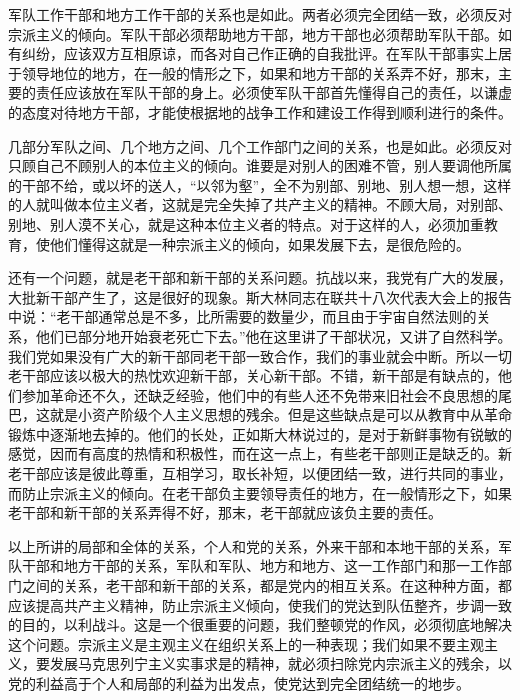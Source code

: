 军队工作干部和地方工作干部的关系也是如此。两者必须完全团结一致，必须反对宗派主义的倾向。军队干部必须帮助地方干部，地方干部也必须帮助军队干部。如有纠纷，应该双方互相原谅，而各对自己作正确的自我批评。在军队干部事实上居于领导地位的地方，在一般的情形之下，如果和地方干部的关系弄不好，那末，主要的责任应该放在军队干部的身上。必须使军队干部首先懂得自己的责任，以谦虚的态度对待地方干部，才能使根据地的战争工作和建设工作得到顺利进行的条件。

几部分军队之间、几个地方之间、几个工作部门之间的关系，也是如此。必须反对只顾自己不顾别人的本位主义的倾向。谁要是对别人的困难不管，别人要调他所属的干部不给，或以坏的送人，“以邻为壑”，全不为别部、别地、别人想一想，这样的人就叫做本位主义者，这就是完全失掉了共产主义的精神。不顾大局，对别部、别地、别人漠不关心，就是这种本位主义者的特点。对于这样的人，必须加重教育，使他们懂得这就是一种宗派主义的倾向，如果发展下去，是很危险的。

还有一个问题，就是老干部和新干部的关系问题。抗战以来，我党有广大的发展，大批新干部产生了，这是很好的现象。斯大林同志在联共十八次代表大会上的报告中说：“老干部通常总是不多，比所需要的数量少，而且由于宇宙自然法则的关系，他们已部分地开始衰老死亡下去。”他在这里讲了干部状况，又讲了自然科学。我们党如果没有广大的新干部同老干部一致合作，我们的事业就会中断。所以一切老干部应该以极大的热忱欢迎新干部，关心新干部。不错，新干部是有缺点的，他们参加革命还不久，还缺乏经验，他们中的有些人还不免带来旧社会不良思想的尾巴，这就是小资产阶级个人主义思想的残余。但是这些缺点是可以从教育中从革命锻炼中逐渐地去掉的。他们的长处，正如斯大林说过的，是对于新鲜事物有锐敏的感觉，因而有高度的热情和积极性，而在这一点上，有些老干部则正是缺乏的。新老干部应该是彼此尊重，互相学习，取长补短，以便团结一致，进行共同的事业，而防止宗派主义的倾向。在老干部负主要领导责任的地方，在一般情形之下，如果老干部和新干部的关系弄得不好，那末，老干部就应该负主要的责任。

以上所讲的局部和全体的关系，个人和党的关系，外来干部和本地干部的关系，军队干部和地方干部的关系，军队和军队、地方和地方、这一工作部门和那一工作部门之间的关系，老干部和新干部的关系，都是党内的相互关系。在这种种方面，都应该提高共产主义精神，防止宗派主义倾向，使我们的党达到队伍整齐，步调一致的目的，以利战斗。这是一个很重要的问题，我们整顿党的作风，必须彻底地解决这个问题。宗派主义是主观主义在组织关系上的一种表现；我们如果不要主观主义，要发展马克思列宁主义实事求是的精神，就必须扫除党内宗派主义的残余，以党的利益高于个人和局部的利益为出发点，使党达到完全团结统一的地步。

